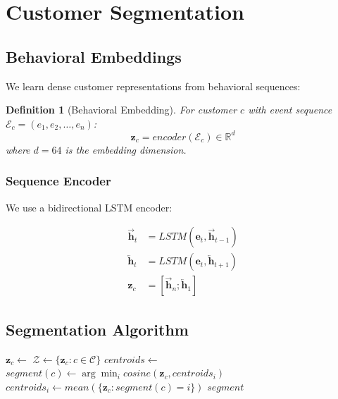 \documentclass[11pt,a4paper]{article}
\newtheorem{definition}[theorem]{Definition}
\begin{document}
\section{Customer Segmentation}

\subsection{Behavioral Embeddings}

We learn dense customer representations from behavioral sequences:

\begin{definition}[Behavioral Embedding]
For customer $c$ with event sequence $\mathcal{E}_c = (e_1, e_2, \ldots, e_n)$:
\begin{equation}
\mathbf{z}_c = encoder(\mathcal{E}_c) \in \mathbb{R}^d
\end{equation}
where $d = 64$ is the embedding dimension.
\end{definition}

\subsubsection{Sequence Encoder}

We use a bidirectional LSTM encoder:

\begin{align}
\overrightarrow{\mathbf{h}}_t &= LSTM(\mathbf{e}_t, \overrightarrow{\mathbf{h}}_{t-1}) \\
\overleftarrow{\mathbf{h}}_t &= LSTM(\mathbf{e}_t, \overleftarrow{\mathbf{h}}_{t+1}) \\
\mathbf{z}_c &= [\overrightarrow{\mathbf{h}}_n; \overleftarrow{\mathbf{h}}_1]
\end{align}

\subsection{Segmentation Algorithm}

\begin{algorithm}
\caption{Behavioral Customer Segmentation}
\begin{algorithmic}[1]
    \State {}
        \State $\mathbf{z}_c \gets$ 
    \EndFor
    \State {}
    \State $\mathcal{Z} \gets \{\mathbf{z}_c : c \in \mathcal{C}\}$
    \State $centroids \gets$ 
    \Repeat
            \State $segment(c) \gets \arg\min_i cosine(\mathbf{z}_c, centroids_i)$
        \EndFor
            \State $centroids_i \gets mean(\{\mathbf{z}_c : segment(c) = i\})$
        \EndFor
    \State \Return $segment$
\EndFunction
\end{algorithmic}
\end{algorithm}
\end{document}
